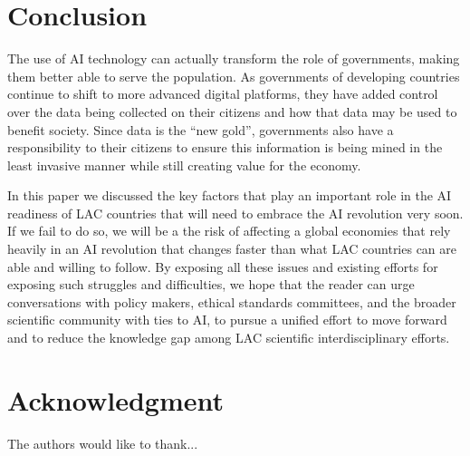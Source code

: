 \documentclass[conference]{IEEEtran}
\begin{document}
\section{Conclusion}

The use of AI technology can actually transform the role of governments, making them better able to serve the population. As governments of developing countries continue to shift to more advanced digital platforms, they have added control over the data being collected on their citizens and how that data may be used to benefit society. Since data is the ``new gold'', governments also have a responsibility to their citizens to ensure this information is being mined in the least invasive manner while still creating value for the economy.

In this paper we discussed the key factors that play an important role in the AI readiness of LAC countries that will need to embrace the AI revolution very soon. If we fail to do so, we will be a the risk of affecting a global economies that rely heavily in an AI revolution that changes faster than what LAC countries can are able and willing to follow. By exposing all these issues and existing efforts for exposing such struggles and difficulties, we hope that the reader can urge conversations with policy makers, ethical standards committees, and the broader scientific community with ties to AI, to pursue a unified effort to move forward and to reduce the knowledge gap among LAC scientific interdisciplinary efforts.


\section*{Acknowledgment}

The authors would like to thank...




\end{document}

